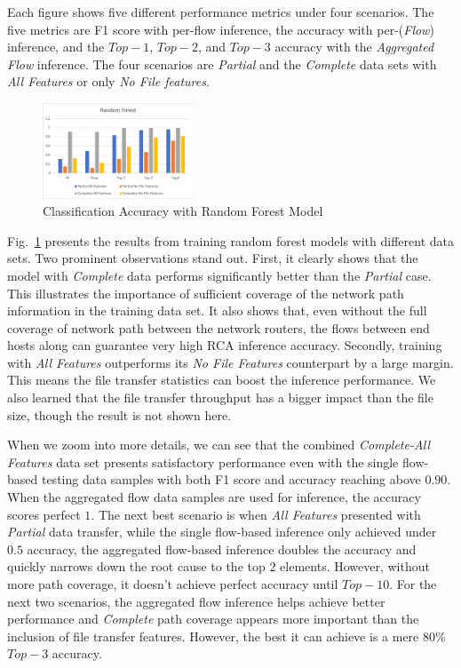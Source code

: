 Each figure shows five different performance metrics under four scenarios. The five metrics are F1 score with per-flow inference, the accuracy with per-({\it Flow}) inference, and the $Top-1$, $Top-2$, and $Top-3$ accuracy with
the {\it Aggregated Flow} inference. The four scenarios are {\it Partial} and the {\it Complete} data sets with {\it All Features} or only {\it No File features}.

\begin{figure}[!ht]
\begin{center}
\includegraphics[width=0.4\textwidth]{./figure/rf-accuracy}
\end{center}
\vspace{-0.1in}
\caption{Classification Accuracy with Random Forest Model}
\label{fig:dt}
\end{figure}

Fig.~\ref{fig:dt} presents the results from training random forest models with different data sets. Two prominent observations stand out. 
First, it clearly shows that the model with {\it Complete} data performs significantly better than the {\it Partial} case. This illustrates the importance of sufficient 
coverage of the network path information in the training data set. It also shows that, even without the full coverage of network path between the network routers, 
the flows between end hosts along can guarantee very high RCA inference accuracy.   
Secondly, training with {\it All Features} outperforms its {\it No File Features} counterpart by a large margin. This means the file transfer statistics can boost the inference performance.  
We also learned that the file transfer throughput has a bigger impact than the file size, though the result is not shown here. 

When we zoom into more details, we can see that the combined {\it Complete-All Features} data set presents satisfactory performance even with the single flow-based testing data samples with 
both F1 score and accuracy reaching above $0.90$. When the aggregated flow data samples are used for inference, the accuracy scores perfect $1$. The next best scenario is when {\it All Features} presented with 
{\it Partial} data transfer, while the single flow-based inference only achieved under $0.5$ accuracy, the aggregated flow-based inference doubles the accuracy and quickly narrows down the root cause to the 
top $2$ elements. However, without more path coverage, it doesn't achieve perfect accuracy until $Top-10$. For the next two scenarios, the aggregated flow inference helps achieve better performance 
and {\it Complete} path coverage appears more important than the inclusion of file transfer features. However, the best it can achieve is a mere $80\%$ $Top-3$ accuracy.  

